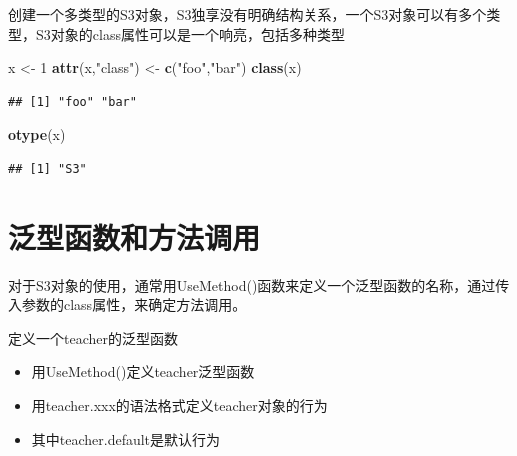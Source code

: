 \documentclass[]{book}
\newenvironment{Shaded}{\begin{snugshade}}{\end{snugshade}}
\newcommand{\KeywordTok}[1]{\textcolor[rgb]{0.13,0.29,0.53}{\textbf{#1}}}
\newcommand{\DecValTok}[1]{\textcolor[rgb]{0.00,0.00,0.81}{#1}}
\newcommand{\StringTok}[1]{\textcolor[rgb]{0.31,0.60,0.02}{#1}}
\newcommand{\NormalTok}[1]{#1}
\begin{document}
创建一个多类型的S3对象，S3独享没有明确结构关系，一个S3对象可以有多个类型，S3对象的class属性可以是一个响亮，包括多种类型

\begin{Shaded}
\begin{Highlighting}[]
\NormalTok{x <-}\StringTok{ }\DecValTok{1}
\KeywordTok{attr}\NormalTok{(x,}\StringTok{"class"}\NormalTok{) <-}\StringTok{ }\KeywordTok{c}\NormalTok{(}\StringTok{"foo"}\NormalTok{,}\StringTok{"bar"}\NormalTok{)}
\KeywordTok{class}\NormalTok{(x)}
\end{Highlighting}
\end{Shaded}

\begin{verbatim}
## [1] "foo" "bar"
\end{verbatim}

\begin{Shaded}
\begin{Highlighting}[]
\KeywordTok{otype}\NormalTok{(x)}
\end{Highlighting}
\end{Shaded}

\begin{verbatim}
## [1] "S3"
\end{verbatim}

\section{泛型函数和方法调用}

对于S3对象的使用，通常用UseMethod()函数来定义一个泛型函数的名称，通过传入参数的class属性，来确定方法调用。

定义一个teacher的泛型函数

\begin{itemize}
\item
  用UseMethod()定义teacher泛型函数
\item
  用teacher.xxx的语法格式定义teacher对象的行为
\item
  其中teacher.default是默认行为
\end{itemize}
\end{document}
